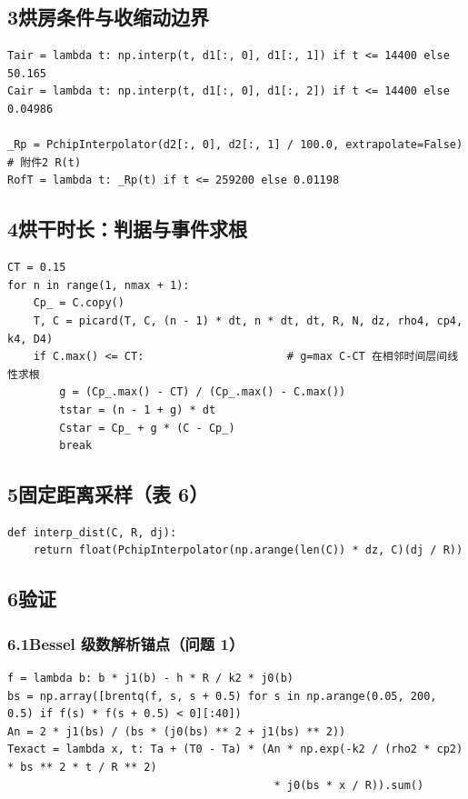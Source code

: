 \documentclass[12pt,a4paper]{ctexart}
\begin{document}
\subsection*{3\quad 烘房条件与收缩动边界}

\begin{lstlisting}
Tair = lambda t: np.interp(t, d1[:, 0], d1[:, 1]) if t <= 14400 else 50.165
Cair = lambda t: np.interp(t, d1[:, 0], d1[:, 2]) if t <= 14400 else 0.04986

_Rp = PchipInterpolator(d2[:, 0], d2[:, 1] / 100.0, extrapolate=False)   # 附件2 R(t)
RofT = lambda t: _Rp(t) if t <= 259200 else 0.01198
\end{lstlisting}

\subsection*{4\quad 烘干时长：判据与事件求根}

\begin{lstlisting}
CT = 0.15
for n in range(1, nmax + 1):
    Cp_ = C.copy()
    T, C = picard(T, C, (n - 1) * dt, n * dt, dt, R, N, dz, rho4, cp4, k4, D4)
    if C.max() <= CT:                      # g=max C-CT 在相邻时间层间线性求根
        g = (Cp_.max() - CT) / (Cp_.max() - C.max())
        tstar = (n - 1 + g) * dt
        Cstar = Cp_ + g * (C - Cp_)
        break
\end{lstlisting}

\subsection*{5\quad 固定距离采样（表 6）}

\begin{lstlisting}
def interp_dist(C, R, dj):
    return float(PchipInterpolator(np.arange(len(C)) * dz, C)(dj / R))
\end{lstlisting}

\subsection*{6\quad 验证}

\subsubsection*{6.1\quad Bessel 级数解析锚点（问题 1）}

\begin{lstlisting}
f = lambda b: b * j1(b) - h * R / k2 * j0(b)
bs = np.array([brentq(f, s, s + 0.5) for s in np.arange(0.05, 200, 0.5) if f(s) * f(s + 0.5) < 0][:40])
An = 2 * j1(bs) / (bs * (j0(bs) ** 2 + j1(bs) ** 2))
Texact = lambda x, t: Ta + (T0 - Ta) * (An * np.exp(-k2 / (rho2 * cp2) * bs ** 2 * t / R ** 2)
                                         * j0(bs * x / R)).sum()
\end{lstlisting}
\end{document}
